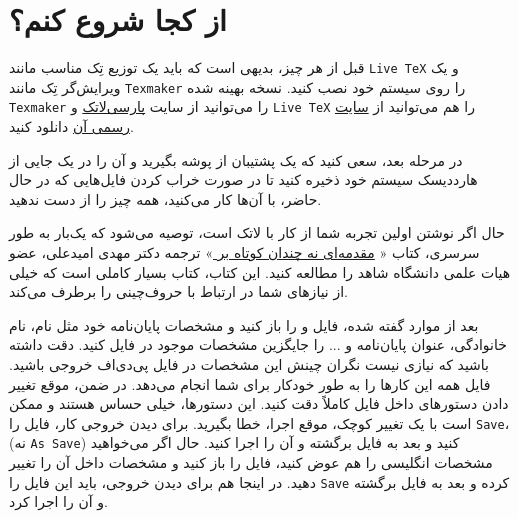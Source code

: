\section{از کجا شروع کنم؟}
قبل از هر چیز، بدیهی است که باید یک توزیع تِک مناسب مانند 
\verb!Live TeX!
و یک ویرایش‌گر تِک مانند
\verb!Texmaker!
را روی سیستم خود نصب کنید.  نسخه بهینه شده \verb!Texmaker!  را می‌توانید  از سایت 
 \href{http://www.parsilatex.com}{پارسی‌لاتک}%
 و \verb!Live TeX!  را هم می‌توانید از 
 \href{http://www.tug.org/texlive}{سایت رسمی آن}%
 دانلود کنید.
 
در مرحله بعد، سعی کنید که  یک پشتیبان از پوشه 
 بگیرید و آن را در یک جایی از هارددیسک سیستم خود ذخیره کنید تا در صورت خراب کردن فایل‌هایی که در حال حاضر، با آن‌ها کار می‌کنید، همه چیز را از 
 دست ندهید.
 
 حال اگر نوشتن \پ اولین تجربه شما از کار با لاتک است، توصیه می‌شود که یک‌بار به طور سرسری، کتاب «%
\href{http://www.tug.ctan.org/tex-archive/info/lshort/persian/lshort.pdf}{مقدمه‌ای نه چندان کوتاه بر
\lr{\LaTeXe}}»
   ترجمه دکتر مهدی امیدعلی، عضو هیات علمی دانشگاه شاهد را مطالعه کنید. این کتاب، کتاب بسیار کاملی است که خیلی از نیازهای شما در ارتباط با حروف‌چینی را برطرف می‌کند.
 
 
بعد از موارد گفته شده، فایل 
و
را باز کنید و مشخصات پایان‌نامه خود مثل نام، نام خانوادگی، عنوان پایان‌نامه و ... را جایگزین مشخصات موجود در فایل
 کنید. دقت داشته باشید که نیازی نیست 
نگران چینش این مشخصات در فایل پی‌دی‌اف خروجی باشید. فایل 
همه این کارها را به طور خودکار برای شما انجام می‌دهد. در ضمن، موقع تغییر دادن دستورهای داخل فایل
 کاملاً دقت کنید. این دستورها، خیلی حساس هستند و ممکن است با یک تغییر کوچک، موقع اجرا، خطا بگیرید. برای دیدن خروجی کار، فایل 
 را 
\verb!Save!، 
(نه 
\verb!As Save!)
کنید و بعد به فایل 
برگشته و آن را اجرا کنید. حال اگر می‌خواهید مشخصات انگلیسی \پ را هم عوض کنید، فایل 
را باز کنید و مشخصات داخل آن را تغییر دهید.%
 در اینجا هم برای دیدن خروجی، باید این فایل را 
\verb!Save!
کرده و بعد به فایل 
برگشته و آن را اجرا کرد.

